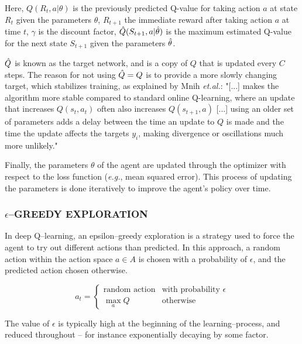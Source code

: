 \documentclass{article}
\let\oldcite\cite
\renewcommand{\cite}[1]{\textbf{\oldcite{#1}}}
\renewenvironment{leftbar}[1][\hsize]{
    \def\FrameCommand{{\color{barcolor}\vrule width 0.5pt \hspace{10pt}}}
    \MakeFramed{\hsize#1 \advance\hsize-\width \FrameRestore}
}{\endMakeFramed}
\begin{document}
\begin{leftbar}
    Here, $Q(R_t, a | \theta)$ is the previously predicted Q-value for taking action $a$ at state $R_t$ given the parameters $\theta$, $R_{t+1}$ the immediate reward after taking action $a$ at time $t$, $\gamma$ is the discount factor, $\Hat{Q}(S_{t+1}, a | \Hat{\theta})$ is the maximum estimated Q-value for the next state $S_{t+1}$ given the parameters $\Hat{\theta}$.

    $\Hat{Q}$ is known as the target network, and is a copy of $Q$ that is updated every $C$ steps. The reason for not using $\Hat{Q} = Q$ is to provide a more slowly changing target, which stabilizes training, as explained by Mnih \textit{et.al.}: "[...] makes the algorithm more stable compared to standard online Q-learning, where an update that increases $Q(s_t,a_t)$ often also increases $Q(s_{t+1},a)$ [...] using an older set of parameters adds a delay between the time an update to $Q$ is made and the time the update affects the targets $y_i$, making divergence or oscillations much more unlikely." \cite{Human-level}

    Finally, the parameters $\theta$ of the agent are updated through the optimizer with respect to the loss function (\textit{e.g.}, mean squared error). This process of updating the parameters is done iteratively to improve the agent's policy over time.

    \subsubsection*{\hfill \large $\epsilon$\footnotesize –GREEDY EXPLORATION}
    In deep Q–learning, an epsilon–greedy exploration is a strategy used to force the agent to try out different actions than predicted. In this approach, a random action within the action space $a \in A$ is chosen with a probability of $\epsilon$, and the predicted action chosen otherwise.

    \hypertarget{eq:epsilon-greedy}{}
    \begin{equation}
        a_t =
        \begin{cases}
        \text{random action} & \text{with probability } \epsilon \\
        \max_a Q & \text{otherwise}
        \end{cases}
    \end{equation}

    The value of $\epsilon$ is typically high at the beginning of the learning–process, and reduced throughout – for instance exponentially decaying by some factor.


\end{leftbar}
\end{document}
